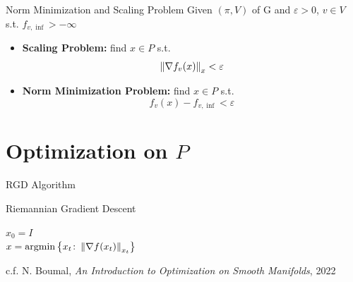 \documentclass{beamer}
\begin{document}
	\begin{frame}{Norm Minimization and Scaling Problem}
		Given $(\pi,V)$ of G and $\varepsilon > 0$, $v \in V$ s.t. $f_{v,\inf} > -\infty$
		\vspace{0.5em}
		\begin{itemize}
			\item \textbf{Scaling Problem:} find $x \in P$ s.t.
			\begin{equation*}
				\left\lVert\nabla f_v(x)\right\lVert_{x} < \varepsilon
			\end{equation*}
			\item \textbf{Norm Minimization Problem:} find $x \in P$ s.t.
			\begin{equation*}
				f_v(x) - f_{v,\inf} < \varepsilon
			\end{equation*}
		\end{itemize}
	\end{frame}

	\section{Optimization on \texorpdfstring{$P$}{P}}

	\begin{frame}{RGD Algorithm}
		\begin{algorithm}[H]
			\SetAlgoNoLine
			\caption{Riemannian Gradient Descent}
			$x_0 = I$ \\
			$x = \operatorname{argmin} \left\{x_t \colon \left\lVert\nabla f(x_t)\right\lVert_{x_t}\right\}$ \\
		\end{algorithm}
		{\footnotesize c.f. \nocite{key7}N. Boumal, \emph{An Introduction to Optimization on Smooth Manifolds}, 2022}
	\end{frame}
\end{document}
